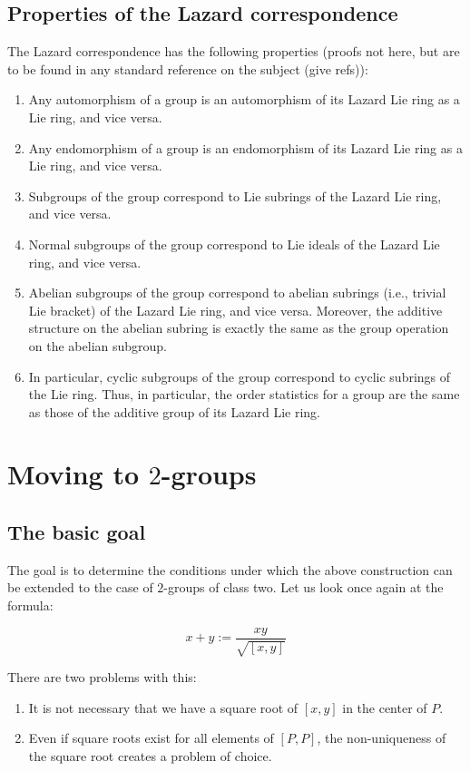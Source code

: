 \documentclass[10pt]{amsart}
\begin{document}
\subsection{Properties of the Lazard correspondence}

The Lazard correspondence has the following properties (proofs not
here, but are to be found in any standard reference on the subject
(give refs)):

\begin{enumerate}
\item Any automorphism of a group is an automorphism of its Lazard Lie
  ring as a Lie ring, and vice versa.
\item Any endomorphism of a group is an endomorphism of its Lazard Lie
  ring as a Lie ring, and vice versa.
\item Subgroups of the group correspond to Lie subrings of the Lazard Lie
  ring, and vice versa.
\item Normal subgroups of the group correspond to Lie ideals of the
  Lazard Lie ring, and vice versa.
\item Abelian subgroups of the group correspond to abelian subrings
  (i.e., trivial Lie bracket) of the Lazard Lie ring, and vice
  versa. Moreover, the additive structure on the abelian subring is
  exactly the same as the group operation on the abelian subgroup.
\item In particular, cyclic subgroups of the group correspond to
  cyclic subrings of the Lie ring. Thus, in particular, the order
  statistics for a group are the same as those of the additive group
  of its Lazard Lie ring.
\end{enumerate}

\section{Moving to $2$-groups}

\subsection{The basic goal}

The goal is to determine the conditions under which the above
construction can be extended to the case of $2$-groups of class
two. Let us look once again at the formula:

$$x + y := \frac{xy}{\sqrt{[x,y]}}$$

There are two problems with this:

\begin{enumerate}
\item It is not necessary that we have a square root of $[x,y]$ in the
  center of $P$.
\item Even if square roots exist for all elements of $[P,P]$, the
  non-uniqueness of the square root creates a problem of choice.
\end{enumerate}
\end{document}
